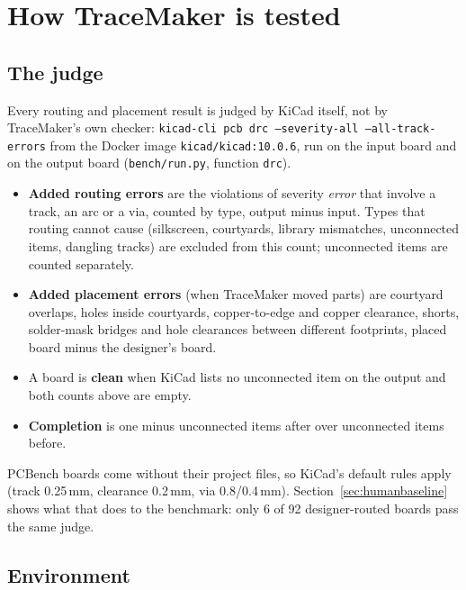 \documentclass[10pt,a4paper]{article}
\newcommand{\code}[1]{\texttt{#1}}
\begin{document}
\section{How TraceMaker is tested}

\subsection{The judge}\label{sec:judge}

Every routing and placement result is judged by KiCad itself, not by TraceMaker's own checker:
\code{kicad-cli pcb drc --severity-all --all-track-errors} from the Docker image \code{kicad/kicad:10.0.6}, run on
the input board and on the output board (\code{bench/run.py}, function \code{drc}).
\begin{itemize}
\item \textbf{Added routing errors} are the violations of severity \emph{error} that involve a track, an arc or a
  via, counted by type, output minus input. Types that routing cannot cause (silkscreen, courtyards, library
  mismatches, unconnected items, dangling tracks) are excluded from this count; unconnected items are counted
  separately.
\item \textbf{Added placement errors} (when TraceMaker moved parts) are courtyard overlaps, holes inside
  courtyards, copper-to-edge and copper clearance, shorts, solder-mask bridges and hole clearances between
  different footprints, placed board minus the designer's board.
\item A board is \textbf{clean} when KiCad lists no unconnected item on the output and both counts above are
  empty.
\item \textbf{Completion} is one minus unconnected items after over unconnected items before.
\end{itemize}
PCBench boards come without their project files, so KiCad's default rules apply (track 0.25\,mm, clearance
0.2\,mm, via 0.8/0.4\,mm). Section~\ref{sec:humanbaseline} shows what that does to the benchmark: only 6 of 92
designer-routed boards pass the same judge.

\subsection{Environment}
\end{document}
